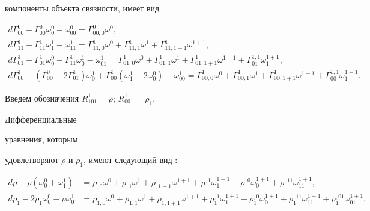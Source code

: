 компоненты объекта связности, имеет вид 


\begin{gather*} 


d\Gamma^0_{00}-\Gamma^0_{00}\omega^0_0-\omega^0_{00}= 


\Gamma^0_{00,0}\omega^0,\\ 


%


d\Gamma^1_{11}-\Gamma^1_{11}\omega^1_1-\omega^1_{11}= 


\Gamma^1_{11,0}\omega^0+\Gamma^1_{11,1}\omega^1+ 


\Gamma^1_{11,1+1}\omega^{1+1},\\ 


%


d\Gamma^1_{01}-\Gamma^1_{01}\omega^0_0- 


\Gamma^1_{11}\omega^1_0-\omega^1_{01}=\Gamma^1_{01,0} 


\omega^0+\Gamma^1_{01,1}\omega^1+\Gamma^1_{01,1+1} 


\omega^{1+1}+\Gamma^{1,1}_{01}\omega^{1+1}_1,\\ 


%


d\Gamma^1_{00}+(\Gamma^0_{00}-2\Gamma^1_{01})\omega^1_0+ 


\Gamma^1_{00}(\omega^1_1-2\omega^0_0)-\omega^1_{00}= 


\Gamma^1_{00,0}\omega^0+\Gamma^1_{00,1}\omega^1+ 


\Gamma^1_{00,1+1}\omega^{1+1}+\Gamma^{1,1}_{00}\omega^{1+1}_1. 


\end{gather*} 


 


Введем обозначения $R^1_{101}=\rho$; $R^1_{001}=\rho_1$. 


Дифференциальные 


уравнения, которым 


удовлетворяют $\rho$ и $\rho_1$, имеют следующий вид : 


\begin{equation} 


\begin{split} 


d\rho-\rho(\omega^0_0+\omega^1_1)&=\rho_{,0}\omega^0+ 


\rho_{,1}\omega^1+\rho_{,1+1}\omega^{1+1}+ 


\rho^{,1}\omega^{1+1}_1+\rho^{,0}\omega^{1+1}_0+ 


\rho^{,11}\omega^{1+1}_{11},\\ 


d\rho_1-2\rho_1\omega^0_0-\rho\omega^1_0&=\rho_{1,0}\omega^0 


+\rho_{1,1}\omega^1+\rho_{1,1+1}\omega^{1+1}+ 


\rho^{,1}_1\omega^{1+1}_1+\rho^{,0}_1\omega^{1+1}_0+ 


\rho^{,11}_1\omega^{1+1}_{11}+\rho^{,01}_1\omega^{1+1}_{01}. 


\end{split} 


\end{equation} 



